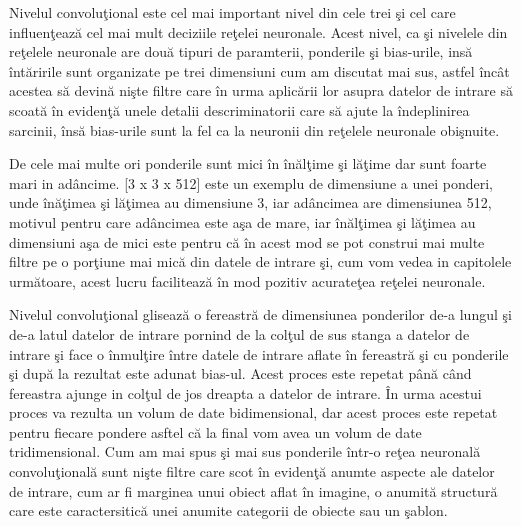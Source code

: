 Nivelul convolu\c{t}ional este cel mai important nivel din cele trei \c{s}i cel care influen\c{t}eaz\u{a} cel mai mult deciziile re\c{t}elei neuronale. Acest nivel, ca \c{s}i nivelele din re\c{t}elele neuronale are dou\u{a} tipuri de paramterii, ponderile \c{s}i bias-urile, ins\u{a} \^{i}nt\u{a}ririle sunt organizate pe trei dimensiuni cum am discutat mai sus, astfel \^{i}nc\^{a}t acestea s\u{a} devin\u{a} ni\c{s}te filtre care \^{i}n urma aplic\u{a}rii lor asupra datelor de intrare s\u{a} scoat\u{a} \^{i}n eviden\c{t}\u{a} unele detalii descriminatorii care s\u{a} ajute la \^{i}ndeplinirea sarcinii, \^{i}ns\u{a} bias-urile sunt la fel ca la neuronii din re\c{t}elele neuronale obi\c{s}nuite. 

\par

De cele mai multe ori ponderile sunt mici \^{i}n \^{i}n\u{a}l\c{t}ime \c{s}i l\u{a}\c{t}ime dar sunt foarte mari in ad\^{a}ncime. [3 x 3 x 512] este un exemplu de dimensiune a unei ponderi, unde \^{i}n\u{a}\c{t}imea \c{s}i l\u{a}\c{t}imea au dimensiune 3, iar ad\^{a}ncimea are dimensiunea 512, motivul pentru care ad\^{a}ncimea este a\c{s}a de mare, iar \^{i}n\u{a}l\c{t}imea \c{s}i l\u{a}\c{t}imea au dimensiuni a\c{s}a de mici  este pentru c\u{a} \^{i}n acest mod se pot construi mai multe filtre pe o por\c{t}iune mai mic\u{a} din datele de intrare \c{s}i, cum vom vedea in capitolele urm\u{a}toare, acest lucru faciliteaz\u{a} \^{i}n mod pozitiv acurate\c{t}ea re\c{t}elei neuronale.

\par

Nivelul convolu\c{t}ional gliseaz\u{a} o fereastr\u{a} de dimensiunea ponderilor de-a lungul \c{s}i de-a latul datelor de intrare pornind de la col\c{t}ul de sus stanga a datelor de intrare \c{s}i face o \^{i}nmul\c{t}ire \^{i}ntre  datele de intrare aflate \^{i}n fereastr\u{a} \c{s}i cu ponderile \c{s}i  dup\u{a} la rezultat este adunat bias-ul. Acest proces este repetat p\^{a}n\u{a} c\^{a}nd fereastra ajunge in col\c{t}ul de jos dreapta a datelor de intrare. \^{I}n urma acestui proces va rezulta un volum de date bidimensional, dar acest proces este repetat pentru fiecare pondere asftel c\u{a} la final vom avea un volum de date tridimensional. Cum am mai spus \c{s}i mai sus ponderile \^{i}ntr-o re\c{t}ea neuronal\u{a} convolu\c{t}ional\u{a} sunt ni\c{s}te filtre care scot \^{i}n eviden\c{t}\u{a} anumte aspecte ale datelor de intrare, cum ar fi marginea unui obiect aflat \^{i}n imagine, o anumit\u{a} structur\u{a} care este caractersitic\u{a} unei anumite categorii de obiecte sau un \c{s}ablon.

